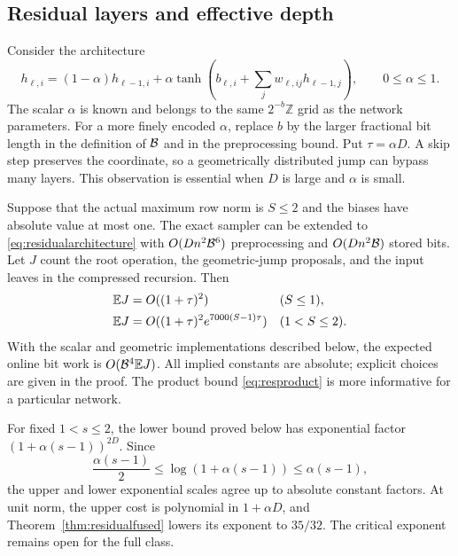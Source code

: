 \subsection{Residual layers and effective depth}\label{sec:residual}

Consider the architecture
\begin{equation}\label{eq:residualarchitecture}
h_{\ell,i}=(1-\alpha)h_{\ell-1,i}
 +\alpha\tanh\!\left(b_{\ell,i}
       +\sum_jw_{\ell,ij}h_{\ell-1,j}\right),
\qquad 0\le\alpha\le1.
\end{equation}
The scalar $\alpha$ is known and belongs to the same
$2^{-b}\mathbb Z$ grid as the network parameters.
For a more finely encoded $\alpha$, replace $b$ by the larger
fractional bit length in the definition of $\mathcal B$ and in the
preprocessing bound. Put $\tau=\alpha D$.
A skip step preserves the coordinate, so a geometrically distributed
jump can bypass many layers. This observation is essential when $D$
is large and $\alpha$ is small.

\begin{theorem}\label{thm:residualupper}
Suppose that the actual maximum row norm is $S\le2$ and the biases
have absolute value at most one. The exact sampler can be extended
to \eqref{eq:residualarchitecture} with
$O(Dn^2\mathcal B^6)$ preprocessing and $O(Dn^2\mathcal B)$ stored bits.
Let $J$ count the root operation, the geometric-jump proposals, and
the input leaves in the compressed recursion. Then
\begin{align}
\mathbb E J&=O((1+\tau)^2) &&(S\le1),\label{eq:rescriticalupper}\\
\mathbb E J&=O((1+\tau)^2e^{7000(S-1)\tau}) &&(1<S\le2).\label{eq:ressuperupper}
\end{align}
With the scalar and geometric implementations described below,
the expected online bit work is $O(\mathcal B^4\mathbb E J)$.
All implied constants are absolute; explicit choices are given in
the proof. The product bound
\eqref{eq:resproduct} is more informative for a particular network.
\end{theorem}

For fixed $1<s\le2$, the lower bound proved below has exponential
factor $(1+\alpha(s-1))^{2D}$. Since
\[
\frac{\alpha(s-1)}2\le\log(1+\alpha(s-1))
\le\alpha(s-1),
\]
the upper and lower exponential scales agree up to absolute
constant factors. At unit norm, the upper cost is polynomial in
$1+\alpha D$, and Theorem~\ref{thm:residualfused} lowers its exponent
to $35/32$. The critical exponent remains open for the full class.

